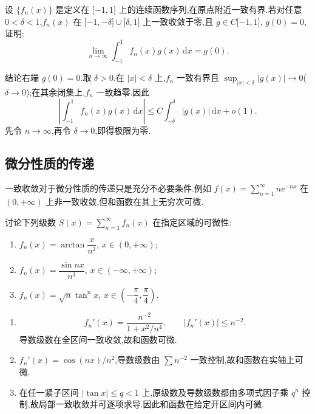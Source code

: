 \begin{example}
    设 $\{f_n(x)\}$ 是定义在 $\lbrack -1,1\rbrack$ 上的连续函数序列,在原点附近一致有界.若对任意 $0<\delta<1$,$f_n(x)$ 在 $\lbrack -1,-\delta\rbrack\cup\lbrack \delta,1\rbrack$ 上一致收敛于零,且 $g\in C\lbrack -1,1\rbrack$, $g(0)=0$,证明:
    \[
        \displaystyle\lim\limits_{n\to\infty}\int_{-1}^{1}f_n(x)g(x)\,\mathrm{d}x=g(0).
    \]
\end{example}
\exampleblank

\begin{solution}
    结论右端 $g(0)=0$.取 $\delta>0$.在 $|x|<\delta$ 上,$f_n$ 一致有界且
    $\sup_{|x|<\delta}|g(x)|\to0$($\delta\to0$);在其余闭集上,$f_n$ 一致趋零.因此
    \[
        \left|\int_{-1}^{1}f_n(x)g(x)\,\mathrm{d}x\right|
        \leq C\int_{-\delta}^{\delta}|g(x)|\,\mathrm{d}x+o(1).
    \]
    先令 $n\to\infty$,再令 $\delta\to0$,即得极限为零.
\end{solution}



\subsection{微分性质的传递}

一致收敛对于微分性质的传递只是充分不必要条件.例如 $\displaystyle f(x)=\sum\limits_{n=1}^{\infty}ne^{-nx}$ 在 $(0,+\infty)$ 上非一致收敛,但和函数在其上无穷次可微.

\begin{example}
    讨论下列级数 $\displaystyle S(x)=\sum\limits_{n=1}^{\infty}f_n(x)$ 在指定区域的可微性:
    \begin{enumerate}
        \item $f_n(x)=\arctan\dfrac{x}{n^2}$, $x\in(0,+\infty)$;
        \item $f_n(x)=\dfrac{\sin nx}{n^3}$, $x\in(-\infty,+\infty)$;
        \item $f_n(x)=\sqrt n\tan^n x$, $x\in\left(-\dfrac{\pi}{4},\dfrac{\pi}{4}\right)$.
    \end{enumerate}
\end{example}
\exampleblank

\begin{solution}
    \leavevmode
    \begin{enumerate}
        \item
              \[
                  f_n'(x)=\dfrac{n^{-2}}{1+x^2/n^4},\qquad |f_n'(x)|\leq n^{-2}.
              \]
              导数级数在全区间一致收敛,故和函数可微.
        \item $f_n'(x)=\cos(nx)/n^2$,导数级数由 $\displaystyle\sum n^{-2}$ 一致控制,故和函数在实轴上可微.
        \item 在任一紧子区间 $|\tan x|\leq q<1$ 上,原级数及导数级数都由多项式因子乘 $q^n$ 控制,故局部一致收敛并可逐项求导.因此和函数在给定开区间内可微.
    \end{enumerate}
\end{solution}

